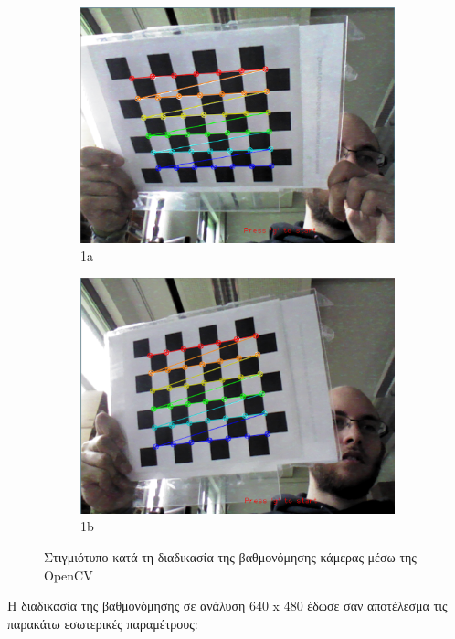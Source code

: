 \begin{figure}
\begin{subfigure}{.5\textwidth}
  \centering
  \includegraphics[width=.9\linewidth]{Files/Figures/calibration.png}
  \caption{1a}
  \label{fig:calibration_screenshot1}
\end{subfigure}%
\begin{subfigure}{.5\textwidth}
  \centering
  \includegraphics[width=.9\linewidth]{Files/Figures/calib2.png}
  \caption{1b}
  \label{fig:calibration_screenshot2}
\end{subfigure}
\caption[Στιγμιότυπο κατά τη διαδικασία της βαθμονόμησης κάμερας μέσω της OpenCV]{Στιγμιότυπο κατά τη διαδικασία της βαθμονόμησης κάμερας μέσω της OpenCV}
\label{fig:calibration_screenshot}
\end{figure}


Η διαδικασία της βαθμονόμησης σε ανάλυση 640 x 480 έδωσε σαν αποτέλεσμα τις παρακάτω εσωτερικές παραμέτρους:


